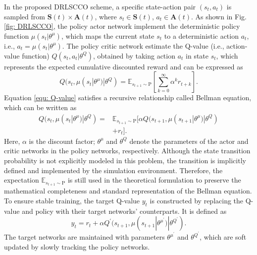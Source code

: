 \documentclass[lettersize,journal]{IEEEtran}
\begin{document}
In the proposed DRLSCCO scheme, a specific state-action pair $ (s_t,a_t) $ is sampled from $ \mathbf{S}(t) \times \mathbf{A}(t) $, where $ s_t\in \mathbf{S}(t) $, $ a_t\in \mathbf{A}(t) $.
As shown in Fig. \ref{fig: DRLSCCO}, the policy actor network implement the deterministic policy function $\mu(s_t|\theta^{\mu})$, which maps the current state $ s_t $ to a deterministic action $ a_t $, i.e., $ a_t = \mu(s_t|\theta^{\mu}) $. The policy critic network estimate the  Q-value (i.e., action-value function) $Q(s_t, a_t|\theta^{Q})$, obtained by taking action $ a_t $ in state $ s_t $, which  represents the expected cumulative discounted reward and can be expressed as
\begin{equation}
	\label{equ: Q-value}
	Q(s_t, \mu(s_t|\theta^{\mu})|\theta^{Q}) = \mathbb{E}_{s_{t+1}\sim \mathrm{P}} \left[ \sum_{k=0}^{\infty}{\alpha^{k}r_{t+k}} \right].
\end{equation}
Equation \eqref{equ: Q-value} satisfies a recursive relationship called Bellman equation, which can be written as
\begin{equation}
	\label{equ: Bellman}
	\begin{aligned}
		Q(s_t, \mu(s_t|\theta^{\mu})|\theta^{Q}) = &  \mathbb{E}_{s_{t+1}\sim \mathrm{P}} \big[  \alpha Q(s_{t+1}, \mu(s_{t+1}|\theta^{\mu})|\theta^{Q})  \\ 
												  & + r_t  \big].
	\end{aligned}
\end{equation}
Here, $ \alpha $ is the discount factor; $ \theta^{\mu} $ and $ \theta^{Q} $ denote the parameters of the actor and critic networks in the policy networks, respectively. 
Although the state transition probability is not explicitly modeled in this problem, the transition is implicitly defined and implemented by the simulation environment. Therefore, the expectation $ \mathbb{E}_{s_{t+1} \sim \mathrm{P}} $ is still used in the theoretical formulation to preserve the mathematical completeness and standard representation of the Bellman equation.
To ensure stable training, the target Q-value  $ y_t $ is constructed by replacing the Q-value  and policy with their target networks' counterparts. It is defined as
\begin{equation}
	\label{equ: target Q-value}
	y_t = r_t + \alpha Q^{\prime}(s_{t+1}, \mu(s_{t+1}|\theta^{\mu^{\prime}})|\theta^{{Q^{\prime}}}).
\end{equation}
The target networks are maintained with parameters $ \theta^{\mu^{\prime}}$ and $ \theta^{Q^\prime} $, which are soft updated by slowly tracking the policy networks.
\end{document}
